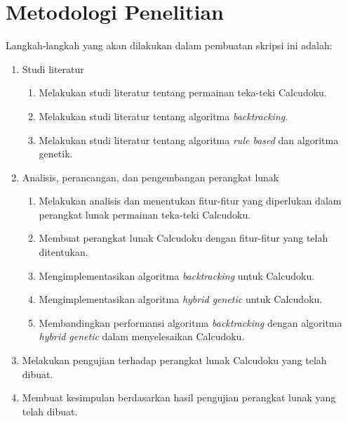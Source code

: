 \section{Metodologi Penelitian}
\label{sec:metodologipenelitian}
Langkah-langkah yang akan dilakukan dalam pembuatan skripsi ini adalah:
\begin{enumerate}
\item Studi literatur
\begin{enumerate}
\item Melakukan studi literatur tentang permainan teka-teki Calcudoku.
\item Melakukan studi literatur tentang algoritma \textit{backtracking}.
\item Melakukan studi literatur tentang algoritma \textit{rule based} dan algoritma genetik.
\end{enumerate}
\item Analisis, perancangan, dan pengembangan perangkat lunak
\begin{enumerate}
\item Melakukan analisis dan menentukan fitur-fitur yang diperlukan dalam perangkat lunak permainan teka-teki Calcudoku.
\item Membuat perangkat lunak Calcudoku dengan fitur-fitur yang telah ditentukan. 
\item Mengimplementasikan algoritma \textit{backtracking} untuk Calcudoku.
\item Mengimplementasikan algoritma \textit{hybrid genetic} untuk Calcudoku.
\item Membandingkan performansi algoritma \textit{backtracking} dengan algoritma \textit{hybrid genetic} dalam menyelesaikan Calcudoku.
\end{enumerate}
\item Melakukan pengujian terhadap perangkat lunak Calcudoku yang telah dibuat.
\item Membuat kesimpulan berdasarkan hasil pengujian perangkat lunak yang telah dibuat.
\end{enumerate}

